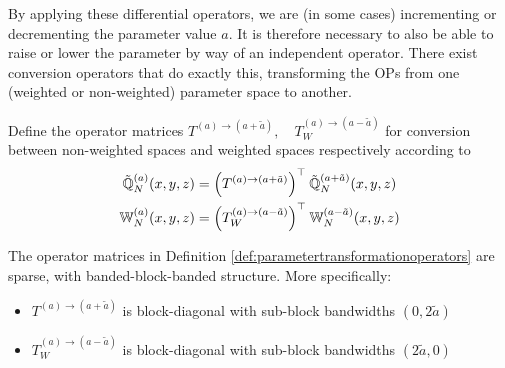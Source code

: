\documentclass[11pt, oneside]{article}   	%
\begin{document}
By applying these differential operators, we are (in some cases) incrementing or decrementing the parameter value $a$. It is therefore necessary to also be able to raise or lower the parameter by way of an independent operator. There exist conversion  operators that do exactly this, transforming the OPs from one (weighted or non-weighted) parameter space to another.
\begin{definition}\label{def:parametertransformationoperators}
Define the operator matrices $T^{(a)\to(a+\tilde a)}, \quad T_W^{(a)\to(a-\tilde a)}$ for conversion between non-weighted spaces and weighted spaces respectively according to
\begin{align*}
	{\mathbb{\tilde Q}}^{(a)}_{N}(x,y,z) &= \Big(T^{(a)\to(a+\tilde a)} \Big)^\top \: {\mathbb{\tilde Q}}_{N}^{(a+\tilde a)}(x,y,z) \\
	\mathbb{W}_N^{(a)}(x,y,z) &= \Big(T_W^{(a)\to(a-\tilde a)} \Big)^\top \: \mathbb{W}_N^{(a-\tilde a)}(x,y,z)
\end{align*}
\end{definition}

\begin{lemma}\label{lemma:sparsityofparametertransformationoperators}
The operator matrices in Definition \ref{def:parametertransformationoperators} are sparse, with banded-block-banded structure. More specifically:
\begin{itemize}
	\item $T^{(a)\to(a+\tilde a)}$ is block-diagonal with sub-block bandwidths $(0,2\tilde a)$
	\item $T_W^{(a)\to(a-\tilde a)}$ is block-diagonal with sub-block bandwidths $(2\tilde a, 0)$
\end{itemize}
\end{lemma}
\end{document}
